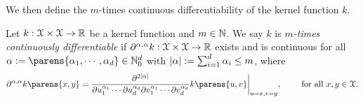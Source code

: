 
We then define the $m$-times continuous differentiability of the kernel function $k$. 

\begin{definition}
	Let $k: \mathcal{X} \times \mathcal{X} \to \mathbb{R}$ be a kernel function and $m \in \mathbb{N}$. We say $k$ is \textit{$m$-times continuously differentiable} if $\partial^{\alpha, \alpha}k: \mathcal{X} \times \mathcal{X} \to \mathbb{R}$ exists and is continuous for all $\alpha := \parens{\alpha_1, \cdots, \alpha_d} \in \Natural_0^d$ with $\lvert\alpha\rvert := \sum_{i=1}^d \alpha_i \le m$, where 
	\begin{align*}
		\partial^{\alpha, \alpha} k \parens{x, y} 
		= \frac{\partial^{2\abs{\alpha}}}{\partial u_1^{\alpha_1} \cdots \partial u_d^{\alpha_d} \partial v_1^{\alpha_1} \cdots \partial v_d^{\alpha_d}} k \parens{u, v}\bigg\vert_{u=x, v=y}, \qquad \text{ for all } x, y \in \calX. 
	\end{align*}
\end{definition}


